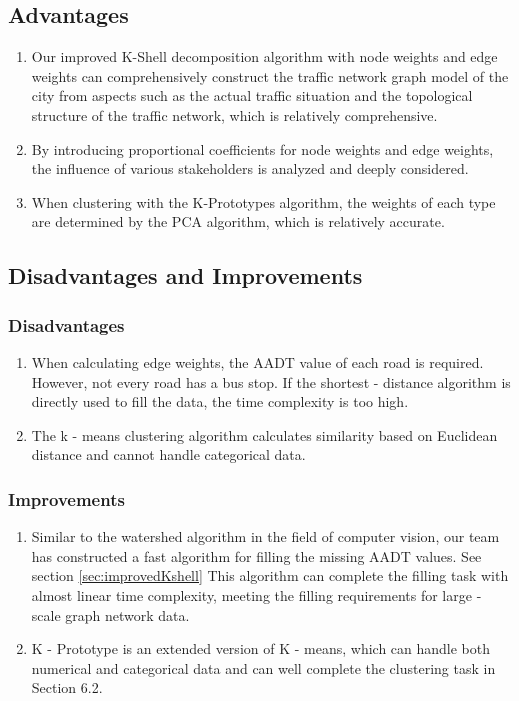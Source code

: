 \documentclass{mcmthesis}
\begin{document}
\subsection{Advantages}
\begin{enumerate}
    \item Our improved K-Shell decomposition algorithm with node weights and edge weights can comprehensively construct the traffic network graph model of the city from aspects such as the actual traffic situation and the topological structure of the traffic network, which is relatively comprehensive.
    \item By introducing proportional coefficients for node weights and edge weights, the influence of various stakeholders is analyzed and deeply considered.
    \item When clustering with the K-Prototypes algorithm, the weights of each type are determined by the PCA algorithm, which is relatively accurate.
\end{enumerate}

\subsection{Disadvantages and Improvements}
\subsubsection{Disadvantages}
\begin{enumerate}
    \item When calculating edge weights, the AADT value of each road is required. However, not every road has a bus stop. If the shortest - distance algorithm is directly used to fill the data, the time complexity is too high.
    \item The k - means clustering algorithm calculates similarity based on Euclidean distance and cannot handle categorical data.
\end{enumerate}

\subsubsection{Improvements}
\begin{enumerate}
    \item Similar to the watershed algorithm in the field of computer vision\cite{Vincent1991}, our team has constructed a fast algorithm for filling the missing AADT values. See section \ref{sec:improvedKshell} This algorithm can complete the filling task with almost linear time complexity, meeting the filling requirements for large - scale graph network data.
    \item K - Prototype is an extended version of K - means, which can handle both numerical and categorical data and can well complete the clustering task in Section 6.2.
\end{enumerate}
\end{document}
